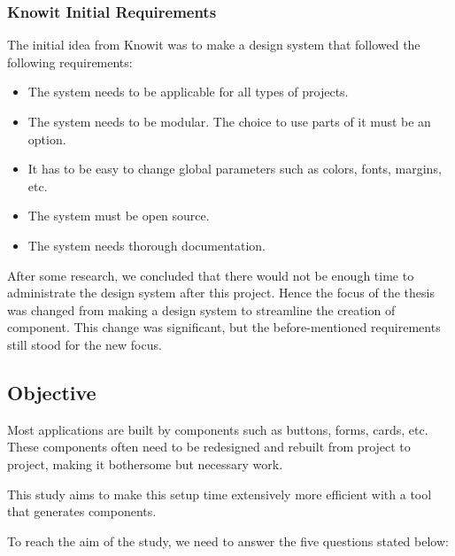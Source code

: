 \subsubsection{Knowit Initial Requirements}%
\label{ssub:Knowit Initial Requirements}
The initial idea from Knowit was to make a design system\cite{fanguyComprehensiveGuideDesign} that followed the following requirements:
\begin{itemize}
  \item The system needs to be applicable for all types of projects.
  \item The system needs to be modular. The choice to use parts of it must be an option.
  \item It has to be easy to change global parameters such as colors, fonts, margins, etc.
  \item The system must be open source.
  \item The system needs thorough documentation.
\end{itemize}

After some research, we concluded that there would not be enough time to administrate the design system after this project. Hence the focus of the thesis was changed from making a design system to streamline the creation of \gls{component}. This change was significant, but the before-mentioned requirements still stood for the new focus. 




\subsection{Objective}
\label{sub:Objective}
Most applications are built by \glspl{component} such as buttons, forms, cards\cite{babichSimpleDesignTips2020}, etc. These \glspl{component} often need to be redesigned and rebuilt from project to project, making it bothersome but necessary work. 

This study aims to make this setup time extensively more efficient with a tool that generates \glspl{component}. 

To reach the aim of the study, we need to answer the five questions stated below:  

